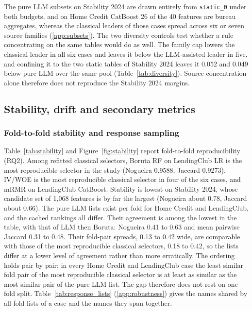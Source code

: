 \documentclass[final,5p,twocolumn]{elsarticle}
\begin{document}
The pure LLM subsets on Stability 2024 are drawn entirely from \texttt{static\_0} under both budgets, and on Home Credit CatBoost 26 of the 40 features are bureau aggregates, whereas the classical leaders of those cases spread across six or seven source families (\ref{app:subsets}). The two diversity controls test whether a rule concentrating on the same tables would do as well. The family cap lowers the classical leader in all six cases and leaves it below the LLM-assisted leader in five, and confining it to the two static tables of Stability 2024 leaves it $0.052$ and $0.049$ below pure LLM over the same pool (Table~\ref{tab:diversity}). Source concentration alone therefore does not reproduce the Stability 2024 margins.

\subsection{Stability, drift and secondary metrics}
\label{subsec:stability_drift}

\subsubsection{Fold-to-fold stability and response sampling}
\label{subsec:stability_results}

Table~\ref{tab:stability} and Figure~\ref{fig:stability} report fold-to-fold reproducibility (RQ2). Among refitted classical selectors, Boruta RF on LendingClub LR is the most reproducible selector in the study (Nogueira 0.9588, Jaccard 0.9273). IV/WOE is the most reproducible classical selector in four of the six cases, and mRMR on LendingClub CatBoost. Stability is lowest on Stability 2024, whose candidate set of 1,068 features is by far the largest (Nogueira about 0.78, Jaccard about 0.66). The pure LLM lists exist per fold for Home Credit and LendingClub, and the cached rankings all differ. Their agreement is among the lowest in the table, with that of LLM then Boruta: Nogueira 0.41 to 0.63 and mean pairwise Jaccard 0.31 to 0.48. Their fold-pair spreads, 0.13 to 0.42 wide, are comparable with those of the most reproducible classical selectors, 0.18 to 0.42, so the lists differ at a lower level of agreement rather than more erratically. The ordering holds pair by pair: in every Home Credit and LendingClub case the least similar fold pair of the most reproducible classical selector is at least as similar as the most similar pair of the pure LLM list. The gap therefore does not rest on one fold split. Table~\ref{tab:response_lists} (\ref{app:robustness}) gives the names shared by all fold lists of a case and the names they span together.
\end{document}
